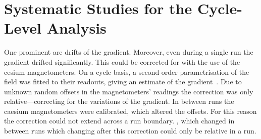 





\section{Systematic Studies for the Cycle-Level Analysis}
One prominent are drifts of the gradient.
Moreover, even during a single run the gradient drifted significantly. This could be corrected for with the use of the cesium magnetometers. On a cycle basis, a second-order parametrisation of the field was fitted to their readouts, giving an estimate of the gradient~\cite{Afach2014magmoment,WurstenThesis}. Due to unknown random offsets in the magnetometers' readings the correction was only relative---correcting for the variations of the gradient. In between runs the caesium magnetometers were calibrated, which altered the offsets. For this reason the correction could not extend across a run boundary. 
, which changed in between runs which changing after this correction could only be relative in a run.


